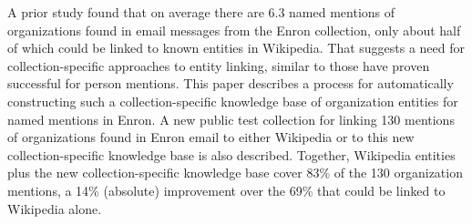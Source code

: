 A prior study found that on average there are 6.3 named mentions of organizations found in email messages from the Enron collection, only about half of which could be linked to known entities in Wikipedia. That suggests a need for collection-specific approaches to entity linking, similar to those have proven successful for person mentions. This paper describes a process for automatically constructing such a collection-specific knowledge base of organization entities for named mentions in Enron. A new public test collection for linking 130 mentions of organizations found in Enron email to either Wikipedia or to this new collection-specific knowledge base is also described. Together, Wikipedia entities plus the new collection-specific knowledge base cover 83\% of the 130 organization mentions, a 14\% (absolute) improvement over the 69\% that could be linked to Wikipedia alone.
